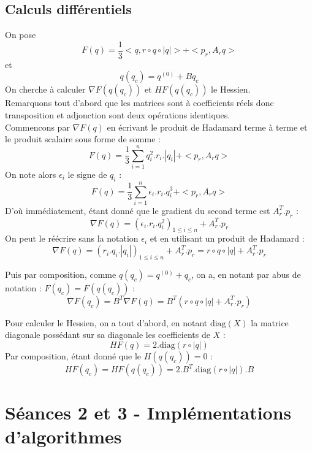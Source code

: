 \documentclass{article}
\begin{document}
    \subsection{Calculs différentiels}
        On pose \[ F(q) = \frac{1}{3}<q, r \circ q \circ |q|> + <p_r, A_rq> \] et \[q(q_c) = q^{(0)} + Bq_c \]
        On cherche à calculer $\nabla F(q(q_c))$ et $H F(q(q_c))$ le Hessien.\\
        Remarquons tout d'abord que les matrices sont à coefficients réels donc transposition et adjonction sont deux opérations identiques.\\
        Commencons par $\nabla F(q)$ en écrivant le produit de Hadamard terme à terme et le produit scalaire sous forme de somme :
        \[ F(q) = \frac{1}{3}\sum_{i = 1}^n q_i^2.r_i.|q_i| + <p_r, A_rq>\]
        On note alors $\epsilon_i$ le signe de $q_i$ :
        \[ F(q) = \frac{1}{3}\sum_{i = 1}^n \epsilon_i.r_i.q_i^3 + <p_r, A_rq>\]
        D'où immédiatement, étant donné que le gradient du second terme est $A_r^T.p_r$ :
        \[\nabla F(q) = (\epsilon_i.r_i.q_i^2)_{1 \leq i \leq n} + A_r^T.p_r\]
        On peut le réécrire sans la notation $\epsilon_i$ et en utilisant un produit de Hadamard : 
        \[ \boxed{\nabla F(q) = (r_i.q_i.|q_i|)_{1 \leq i \leq n} + A_r^T.p_r
            = r\circ q \circ |q| + A_r^T.p_r}\]

        Puis par composition, comme $q(q_c) = q^{(0)} + q_c$, on a, en notant par abus de notation : $F(q_c) = F(q(q_c))$ :
        \[ \boxed{\nabla F(q_c) = B^T\nabla F(q) = B^T(r\circ q \circ |q| + A_r^T.p_r)  
        }\]

        Pour calculer le Hessien, on a tout d'abord, en notant $\text{diag}(X)$ la matrice diagonale possédant sur sa diagonale les coefficients de $X$ :
        \[H F(q) = 2.\text{diag}(r\circ|q|)\]
        Par composition, étant donné que le $H(q(q_c)) = 0$ :
        \[ \boxed{H F(q_c) = H F(q(q_c)) = 2.B^T.\text{diag}(r\circ|q|).B}
        \] 

    \paragraph{}

\section{Séances 2 et 3 - Implémentations d'algorithmes}
\end{document}
